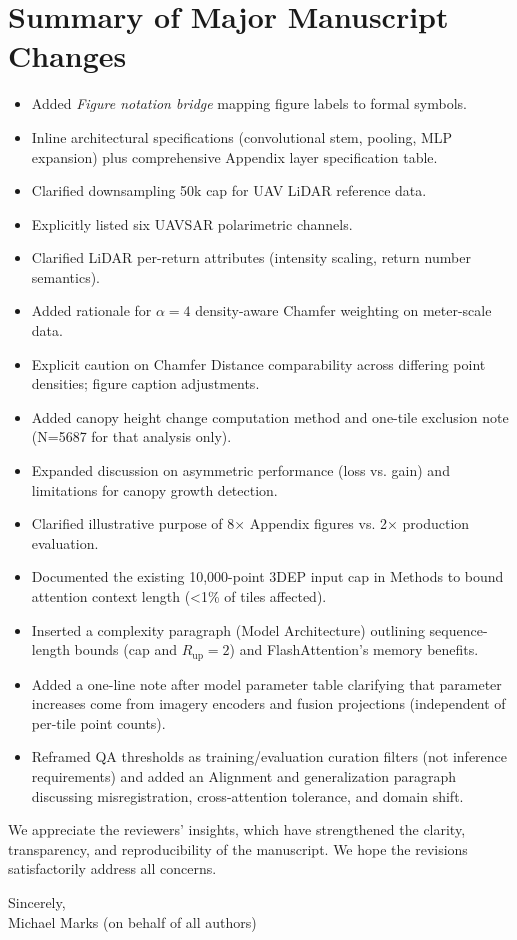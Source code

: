 \documentclass[11pt]{article}
\begin{document}
\section*{Summary of Major Manuscript Changes}
\begin{itemize}
  \item Added \emph{Figure notation bridge} mapping figure labels to formal symbols.
  \item Inline architectural specifications (convolutional stem, pooling, MLP expansion) plus comprehensive Appendix layer specification table.
  \item Clarified downsampling 50k cap for UAV LiDAR reference data.
  \item Explicitly listed six UAVSAR polarimetric channels.
  \item Clarified LiDAR per-return attributes (intensity scaling, return number semantics).
  \item Added rationale for $\alpha=4$ density-aware Chamfer weighting on meter-scale data.
  \item Explicit caution on Chamfer Distance comparability across differing point densities; figure caption adjustments.
  \item Added canopy height change computation method and one-tile exclusion note (N=5687 for that analysis only).
  \item Expanded discussion on asymmetric performance (loss vs. gain) and limitations for canopy growth detection.
  \item Clarified illustrative purpose of 8× Appendix figures vs. 2× production evaluation.
  \item Documented the existing 10,000-point 3DEP input cap in Methods to bound attention context length (\textless{}1\% of tiles affected).
  \item Inserted a complexity paragraph (Model Architecture) outlining sequence-length bounds (cap and $R_{\text{up}}{=}2$) and FlashAttention’s memory benefits.
  \item Added a one-line note after model parameter table clarifying that parameter increases come from imagery encoders and fusion projections (independent of per-tile point counts).
  \item Reframed QA thresholds as training/evaluation curation filters (not inference requirements) and added an Alignment and generalization paragraph discussing misregistration, cross-attention tolerance, and domain shift.

\end{itemize}

We appreciate the reviewers’ insights, which have strengthened the clarity, transparency, and reproducibility of the manuscript. We hope the revisions satisfactorily address all concerns.

\vspace{1em}
\noindent Sincerely,\\[4pt]
Michael Marks (on behalf of all authors)
\end{document}
